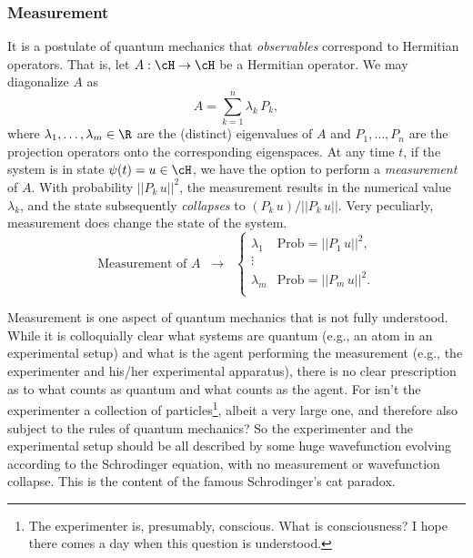 \subsubsection{Measurement}
It is a postulate of quantum mechanics that \emph{observables} correspond to Hermitian operators. That is, let $A: \cH \to \cH$ be a Hermitian operator. We may diagonalize $A$ as
\begin{equation}
    A = \sum_{k=1}^{n}{\lambda_k \, P_k},
\end{equation}
where $\lambda_1, \dots, \lambda_m \in \R$ are the (distinct) eigenvalues of $A$ and $P_1, \dots, P_n$ are the projection operators onto the corresponding eigenspaces. At any time $t$, if the system is in state $\psi(t) = u \in \cH$, we have the option to perform a \emph{measurement} of $A$. With probability $||P_k \, u||^2$, the measurement results in the numerical value $\lambda_k$, and the state subsequently \emph{collapses} to $(P_k \, u) / ||P_k \, u||$. Very peculiarly, measurement does change the state of the system.
\begin{equation}
    \text{Measurement of $A$} \;\;\longrightarrow\;\; \begin{cases}
        \lambda_1 & \text{Prob} = ||P_1 \, u||^2,\\
        \vdots\\
        \lambda_m & \text{Prob} = ||P_m \, u||^2.\\
    \end{cases}
\end{equation}

Measurement is one aspect of quantum mechanics that is not fully understood. While it is colloquially clear what systems are quantum (e.g., an atom in an experimental setup) and what is the agent performing the measurement (e.g., the experimenter and his/her experimental apparatus), there is no clear prescription as to what counts as quantum and what counts as the agent. For isn't the experimenter a collection of particles\footnote{The experimenter is, presumably, conscious. What is consciousness? I hope there comes a day when this question is understood.}, albeit a very large one, and therefore also subject to the rules of quantum mechanics? So the experimenter and the experimental setup should be all described by some huge wavefunction evolving according to the Schrodinger equation, with no measurement or wavefunction collapse. This is the content of the famous Schrodinger's cat paradox.


